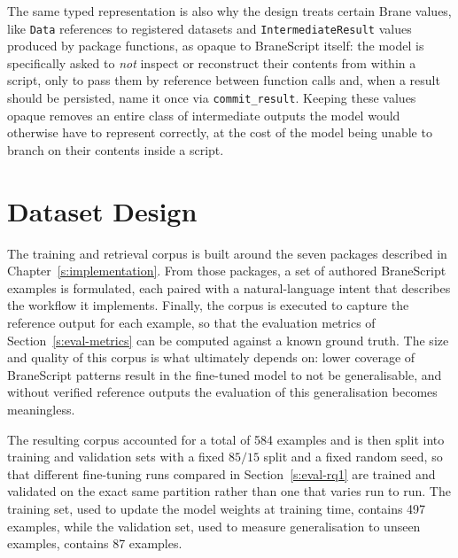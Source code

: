 The same typed representation is also why the design treats certain Brane
values, like \texttt{Data} references to registered datasets and
\texttt{IntermediateResult} values produced by package functions, as opaque
to BraneScript itself: the model is specifically asked to \textit{not} inspect or reconstruct
their contents from within a script, only to pass them by reference between
function calls and, when a result should be persisted, name it once via
\texttt{commit\_result}. Keeping these values opaque removes an entire class
of intermediate outputs the model would otherwise have to represent
correctly, at the cost of the model being unable to branch on their contents
inside a script.

\section{Dataset Design}\label{s:dataset-design}

The training and retrieval corpus is built around the seven packages
described in Chapter~\ref{s:implementation}. From those packages, a set of
authored BraneScript examples is formulated, each paired with a natural-language
intent that describes the workflow it implements.
Finally, the corpus is executed to capture the reference output for each example, so that the evaluation metrics
of Section~\ref{s:eval-metrics} can be computed against a known ground truth.
The size and quality of this corpus is what  ultimately depends on:
lower coverage of BraneScript patterns result in the fine-tuned model
to not be generalisable, and without verified reference outputs the evaluation of
this generalisation becomes meaningless.

The resulting corpus accounted for a total of 584 examples and is 
then split into training and validation sets with a fixed
$85/15$ split and a fixed random seed, so that different fine-tuning runs
compared in Section~\ref{s:eval-rq1} are trained and validated on the exact
same partition rather than one that varies run to run.
The training set, used to update the model weights at training time,
contains 497 examples, while the validation set, used to measure
generalisation to unseen examples, contains 87 examples.

